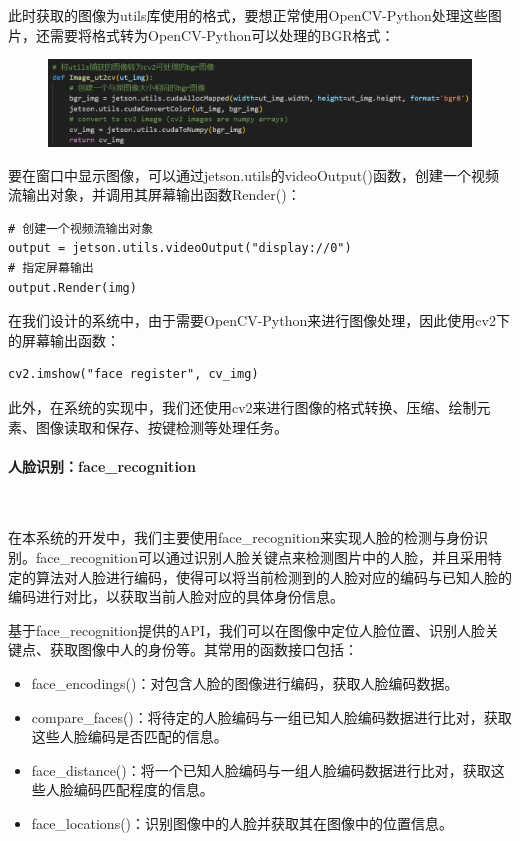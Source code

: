 \documentclass[UTF8]{article}
\begin{document}
此时获取的图像为utils库使用的格式，要想正常使用OpenCV-Python处理这些图片，还需要将格式转为OpenCV-Python可以处理的BGR格式：
\begin{figure}[H]
    \centering %
    \includegraphics[width=1\textwidth]{figure/ut2cv.png} 
\end{figure}

要在窗口中显示图像，可以通过jetson.utils的videoOutput()函数，创建一个视频流输出对象，并调用其屏幕输出函数Render()：
\begin{lstlisting}
# 创建一个视频流输出对象
output = jetson.utils.videoOutput("display://0")
# 指定屏幕输出
output.Render(img)
\end{lstlisting}

在我们设计的系统中，由于需要OpenCV-Python来进行图像处理，因此使用cv2下的屏幕输出函数：
\begin{lstlisting}
cv2.imshow("face register", cv_img)
\end{lstlisting}

此外，在系统的实现中，我们还使用cv2来进行图像的格式转换、压缩、绘制元素、图像读取和保存、按键检测等处理任务。

\paragraph{人脸识别：face\_recognition}~{}

在本系统的开发中，我们主要使用face\_recognition来实现人脸的检测与身份识别。face\_recognition可以通过识别人脸关键点来检测图片中的人脸，并且采用特定的算法对人脸进行编码，使得可以将当前检测到的人脸对应的编码与已知人脸的编码进行对比，以获取当前人脸对应的具体身份信息。

基于face\_recognition提供的API，我们可以在图像中定位人脸位置、识别人脸关键点、获取图像中人的身份等。其常用的函数接口包括：
\begin{itemize}
    \item face\_encodings()：对包含人脸的图像进行编码，获取人脸编码数据。
    \item compare\_faces()：将待定的人脸编码与一组已知人脸编码数据进行比对，获取这些人脸编码是否匹配的信息。
    \item face\_distance()：将一个已知人脸编码与一组人脸编码数据进行比对，获取这些人脸编码匹配程度的信息。
    \item face\_locations()：识别图像中的人脸并获取其在图像中的位置信息。
\end{itemize}
\end{document}
